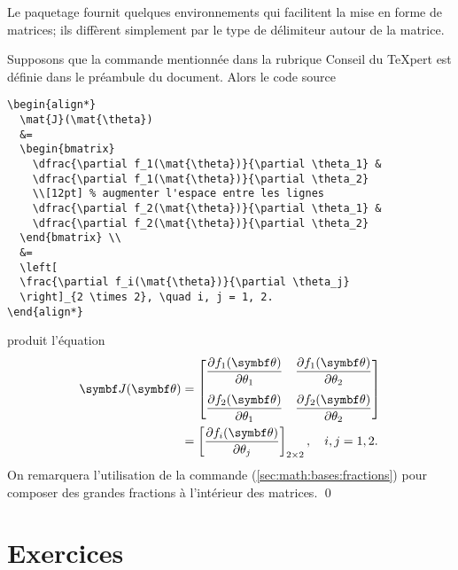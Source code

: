 \begin{exemple}
  \label{ex:math:matrices}
  Le paquetage  fournit quelques environnements qui
  facilitent la mise en forme de matrices; ils diffèrent simplement
  par le type de délimiteur autour de la matrice.

  Supposons que la commande \cmdprint{\mat} mentionnée dans la
  rubrique Conseil du {\TeX}pert est définie dans le préambule du
  document. Alors le code source
\begin{lstlisting}
\begin{align*}
  \mat{J}(\mat{\theta})
  &=
  \begin{bmatrix}
    \dfrac{\partial f_1(\mat{\theta})}{\partial \theta_1} &
    \dfrac{\partial f_1(\mat{\theta})}{\partial \theta_2}
    \\[12pt] % augmenter l'espace entre les lignes
    \dfrac{\partial f_2(\mat{\theta})}{\partial \theta_1} &
    \dfrac{\partial f_2(\mat{\theta})}{\partial \theta_2}
  \end{bmatrix} \\
  &=
  \left[
  \frac{\partial f_i(\mat{\theta})}{\partial \theta_j}
  \right]_{2 \times 2}, \quad i, j = 1, 2.
\end{align*}
\end{lstlisting}
   produit l'équation
  \begin{align*}
    \mat{J}(\mat{\theta})
    &=
      \begin{bmatrix}
        \dfrac{\partial f_1(\mat{\theta})}{\partial \theta_1} &
        \dfrac{\partial f_1(\mat{\theta})}{\partial \theta_2} \\[12pt]
        \dfrac{\partial f_2(\mat{\theta})}{\partial \theta_1} &
        \dfrac{\partial f_2(\mat{\theta})}{\partial \theta_2}
      \end{bmatrix} \\
    &=
      \left[
      \frac{\partial f_i(\mat{\theta})}{\partial \theta_j}
      \right]_{2 \times 2}, \quad i, j = 1, 2.
  \end{align*}
  On remarquera l'utilisation de la commande \cmd{\dfrac}
  (\autoref{sec:math:bases:fractions}) pour composer des grandes
  fractions à l'intérieur des matrices. %
  \qed
\end{exemple}



\section{Exercices}
\label{sec:math:exercices}

